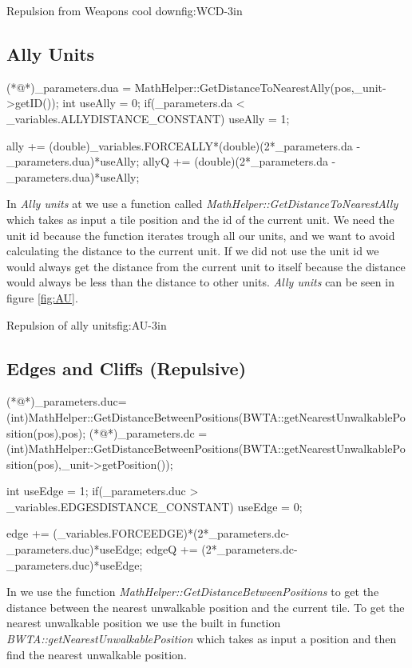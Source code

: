 		{Repulsion from Weapons cool down}{fig:WCD}{-3in}

	\subsection{Ally Units}
		\begin{Sourcecode}[caption=Ally units]
(*@\lnote@*)_parameters.dua = MathHelper::GetDistanceToNearestAlly(pos,_unit->getID());
int useAlly = 0;
if(_parameters.da < _variables.ALLYDISTANCE_CONSTANT)
	useAlly = 1;

ally += (double)_variables.FORCEALLY*(double)(2*_parameters.da - _parameters.dua)*useAlly;
allyQ += (double)(2*_parameters.da - _parameters.dua)*useAlly;
\end{Sourcecode}	
	In \textit{Ally units} at  we use a function called \textit{MathHelper::GetDistanceToNearestAlly} which takes as input a tile position and the id of the current unit. We need the unit id because the function iterates trough all our units, and we want to avoid calculating the distance to the current unit. If we did not use the unit id we would always get the distance from the current unit to itself because the distance would always be less than the distance to other units. \textit{Ally units} can be seen in figure \ref{fig:AU}.
	
			{Repulsion of ally units}{fig:AU}{-3in}

		\pagebreak
	\subsection{Edges and Cliffs (Repulsive)}
	\begin{Sourcecode}[caption=Edges and cliffs]
(*@\lnote@*)_parameters.duc= (int)MathHelper::GetDistanceBetweenPositions(BWTA::getNearestUnwalkablePosition(pos),pos);
(*@\lnote@*)_parameters.dc = (int)MathHelper::GetDistanceBetweenPositions(BWTA::getNearestUnwalkablePosition(pos),_unit->getPosition());

int useEdge = 1;
if(_parameters.duc > _variables.EDGESDISTANCE_CONSTANT)
	useEdge = 0;

edge += (_variables.FORCEEDGE)*(2*_parameters.dc-_parameters.duc)*useEdge;
edgeQ += (2*_parameters.dc-_parameters.duc)*useEdge;
\end{Sourcecode}	
    In  we use the function \textit{MathHelper::GetDistanceBetweenPositions} to get the distance between the nearest unwalkable position and the current tile. To get the nearest unwalkable position we use the built in function \textit{BWTA::getNearestUnwalkablePosition} which takes as input a position and then find the nearest unwalkable position. \\


